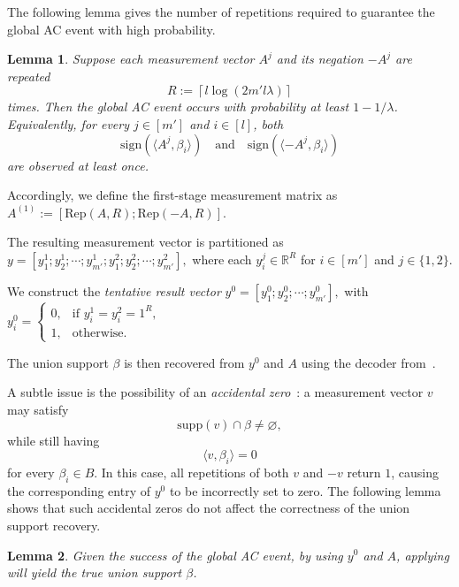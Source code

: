 \documentclass[10pt,a4paper]{amsart}
\newtheorem{lemma}{Lemma}[section]
\newcommand{\supp}{\mathrm{supp}}
\newcommand{\sign}{\mathrm{sign}}
\begin{document}
The following lemma gives the number of repetitions required to guarantee the global AC event with high probability.

\begin{lemma}\label{lem:rep1}
Suppose each measurement vector $A^j$ and its negation $-A^j$ are repeated
\[
R:=\left\lceil l\log(2m'l\lambda)\right\rceil
\]
times. Then the global AC event occurs with probability at least $1-1/\lambda$. Equivalently, for every $j\in[m']$ and $i\in[l]$, both
\[
\sign(\langle A^j,\beta_i\rangle)
\quad\text{and}\quad
\sign(\langle -A^j,\beta_i\rangle)
\]
are observed at least once.
\end{lemma}

Accordingly, we define the first-stage measurement matrix as
\(
A^{(1)}:=[\mathrm{Rep}(A,R);\mathrm{Rep}(-A,R)].
\)

The resulting measurement vector is partitioned as
\(
y=[y_1^1;y_2^1;\cdots;y_{m'}^1;
   y_1^2;y_2^2;\cdots;y_{m'}^2],
\)
where each $y_i^j\in\mathbb{R}^R$ for $i\in[m']$ and $j\in\{1,2\}$. 

We construct the \emph{tentative result vector}
\(
y^0=[y_1^0;y_2^0;\cdots;y_{m'}^0],
\)
with
\(
y_i^0=
\begin{cases}
0,&\text{if }y_i^1=y_i^2=1^R,\\
1,&\text{otherwise.}
\end{cases}
\)

The union support $\beta$ is then recovered from $y^0$ and $A$ using the decoder from~\cite{li2025support}.

A subtle issue is the possibility of an \emph{accidental zero}~\cite{li2025support}: a measurement vector $v$ may satisfy
\[
\supp(v)\cap\beta\neq\varnothing,
\]
while still having
\[
\langle v,\beta_i\rangle=0
\]
for every $\beta_i\in B$. In this case, all repetitions of both $v$ and $-v$ return $1$, causing the corresponding entry of $y^0$ to be incorrectly set to zero. The following lemma shows that such accidental zeros do not affect the correctness of the union support recovery.

\begin{lemma}\label{lem:trueb}
    Given the success of the global AC event, by using $y^0$ and $A$, applying \cite[Algorithm~3]{li2025support} will yield the true union support $\beta$. 
\end{lemma}
\end{document}
